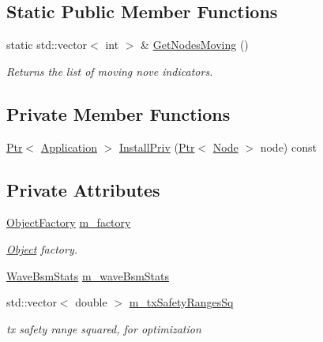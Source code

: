 \subsection*{Static Public Member Functions}
\begin{DoxyCompactItemize}
\item 
static std\+::vector$<$ int $>$ \& \hyperlink{classns3_1_1WaveBsmHelper_a65d2c7844fea14d54f1473c057f5d213}{Get\+Nodes\+Moving} ()
\begin{DoxyCompactList}\small\item\em Returns the list of moving nove indicators. \end{DoxyCompactList}\end{DoxyCompactItemize}
\subsection*{Private Member Functions}
\begin{DoxyCompactItemize}
\item 
\hyperlink{classns3_1_1Ptr}{Ptr}$<$ \hyperlink{classns3_1_1Application}{Application} $>$ \hyperlink{classns3_1_1WaveBsmHelper_a70cd3efe8af9eacfd21792c3b43c97fd}{Install\+Priv} (\hyperlink{classns3_1_1Ptr}{Ptr}$<$ \hyperlink{classns3_1_1Node}{Node} $>$ node) const 
\end{DoxyCompactItemize}
\subsection*{Private Attributes}
\begin{DoxyCompactItemize}
\item 
\hyperlink{classns3_1_1ObjectFactory}{Object\+Factory} \hyperlink{classns3_1_1WaveBsmHelper_a78e835f63e7c901a062d6d3f33cdcd50}{m\+\_\+factory}
\begin{DoxyCompactList}\small\item\em \hyperlink{classns3_1_1Object}{Object} factory. \end{DoxyCompactList}\item 
\hyperlink{classns3_1_1WaveBsmStats}{Wave\+Bsm\+Stats} \hyperlink{classns3_1_1WaveBsmHelper_a5402fdf10496407bc439622b7698e4f7}{m\+\_\+wave\+Bsm\+Stats}
\item 
std\+::vector$<$ double $>$ \hyperlink{classns3_1_1WaveBsmHelper_a44eb2f603f58383dadc9b41eae68d5c9}{m\+\_\+tx\+Safety\+Ranges\+Sq}
\begin{DoxyCompactList}\small\item\em tx safety range squared, for optimization \end{DoxyCompactList}\end{DoxyCompactItemize}
